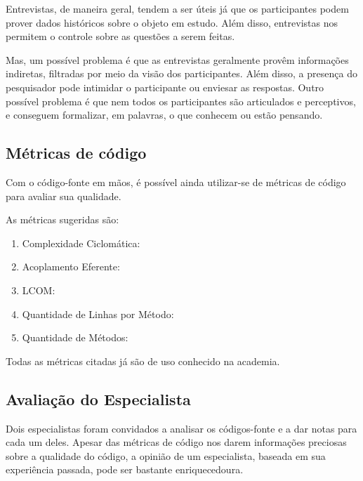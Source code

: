 Entrevistas, de maneira geral, tendem a ser úteis já que os participantes podem prover dados históricos 
sobre o objeto em estudo.
Além disso, entrevistas nos permitem o controle sobre as questões a serem feitas.

Mas, um possível problema é que as entrevistas geralmente provêm informações indiretas, 
filtradas por meio da visão dos participantes. Além disso, a presença do pesquisador pode 
intimidar o participante ou enviesar as respostas.
Outro possível problema é que nem todos os participantes são articulados e perceptivos, e conseguem
formalizar, em palavras, o que conhecem ou estão pensando.


\subsection{Métricas de código}

Com o código-fonte em mãos, é possível ainda utilizar-se de métricas de código
para avaliar sua qualidade.

As métricas sugeridas são:

\begin{enumerate}
	\item Complexidade Ciclomática:
	
	\item Acoplamento Eferente:
	
	\item LCOM:
	
	\item Quantidade de Linhas por Método:
	
	\item Quantidade de Métodos:
	
\end{enumerate}

Todas as métricas citadas já são de uso conhecido na academia.

\subsection{Avaliação do Especialista}
\label{sec:planejamento-especialista}

Dois especialistas foram convidados a analisar os códigos-fonte e a dar notas para cada
um deles. Apesar das métricas de código nos darem informações
preciosas sobre a qualidade do código, a opinião de um especialista, baseada
em sua experiência passada, pode ser bastante enriquecedoura.

